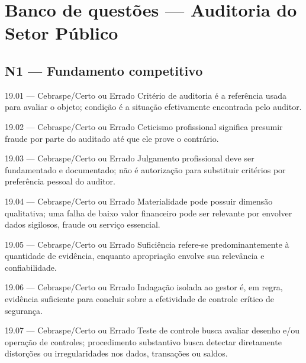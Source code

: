 \section{Banco de questões — Auditoria do Setor Público}

\subsection*{N1 — Fundamento competitivo}

\begin{questao}{ 19.01 — Cebraspe/Certo ou Errado}
Critério de auditoria é a referência usada para avaliar o objeto; condição é a situação efetivamente encontrada pelo auditor.
\end{questao}

\begin{questao}{ 19.02 — Cebraspe/Certo ou Errado}
Ceticismo profissional significa presumir fraude por parte do auditado até que ele prove o contrário.
\end{questao}

\begin{questao}{ 19.03 — Cebraspe/Certo ou Errado}
Julgamento profissional deve ser fundamentado e documentado; não é autorização para substituir critérios por preferência pessoal do auditor.
\end{questao}

\begin{questao}{ 19.04 — Cebraspe/Certo ou Errado}
Materialidade pode possuir dimensão qualitativa; uma falha de baixo valor financeiro pode ser relevante por envolver dados sigilosos, fraude ou serviço essencial.
\end{questao}

\begin{questao}{ 19.05 — Cebraspe/Certo ou Errado}
Suficiência refere-se predominantemente à quantidade de evidência, enquanto apropriação envolve sua relevância e confiabilidade.
\end{questao}

\begin{questao}{ 19.06 — Cebraspe/Certo ou Errado}
Indagação isolada ao gestor é, em regra, evidência suficiente para concluir sobre a efetividade de controle crítico de segurança.
\end{questao}

\begin{questao}{ 19.07 — Cebraspe/Certo ou Errado}
Teste de controle busca avaliar desenho e/ou operação de controles; procedimento substantivo busca detectar diretamente distorções ou irregularidades nos dados, transações ou saldos.
\end{questao}

